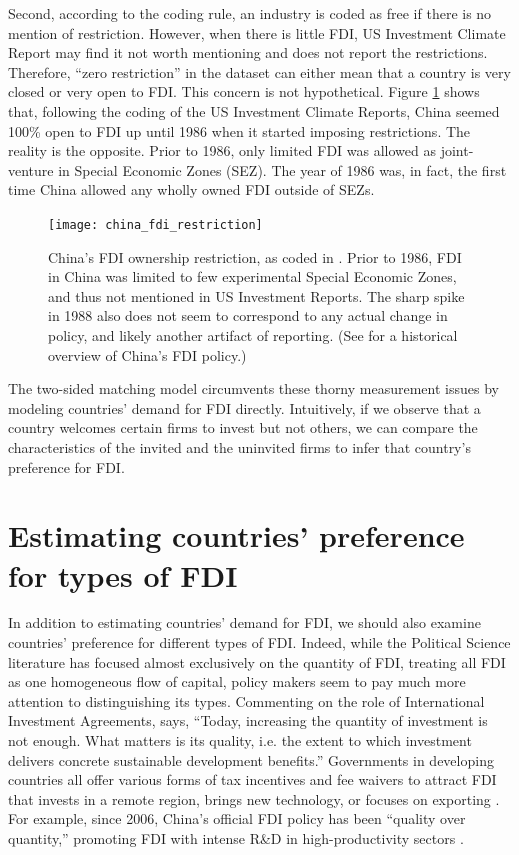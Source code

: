 Second, according to the coding rule, an industry is coded as free if there is
no mention of restriction. However, when there is little FDI, US Investment
Climate Report may find it not worth mentioning and does not report the
restrictions. Therefore, ``zero restriction'' in the dataset can either mean
that a country is very closed or very open to FDI. This concern is not
hypothetical. Figure \ref{fig:china_fdi_restriction} shows that, following the
coding of the US Investment Climate Reports, China seemed 100\% open to FDI up
until 1986 when it started imposing restrictions. The reality is the opposite.
Prior to 1986, only limited FDI was allowed as joint-venture in Special Economic
Zones (SEZ). The year of 1986 was, in fact, the first time China allowed any
wholly owned FDI outside of SEZs.

\begin{figure}[tbp] \centering
  \texttt{[image: china\_fdi\_restriction]}
  \caption[China's FDI ownership restriction.]{China's FDI ownership
    restriction, as coded in \citet{Pandya2010}. Prior to 1986, FDI in China was
    limited to few experimental Special Economic Zones, and thus not mentioned
    in US Investment Reports. The sharp spike in 1988 also does not seem to
    correspond to any actual change in policy, and likely another artifact of
    reporting. (See \citet{Zebregs2002} for a historical overview of China's FDI
    policy.)}
  \label{fig:china_fdi_restriction}
\end{figure}

The two-sided matching model circumvents these thorny measurement issues by
modeling countries' demand for FDI directly. Intuitively, if we observe that a
country welcomes certain firms to invest but not others, we can compare the
characteristics of the invited and the uninvited firms to infer that country's
preference for FDI.

\section{Estimating countries' preference for types of FDI}

In addition to estimating countries' demand for FDI, we should also examine
countries' preference for different types of FDI. Indeed, while the Political
Science literature has focused almost exclusively on the quantity of FDI,
treating all FDI as one homogeneous flow of capital, policy makers seem to pay
much more attention to distinguishing its types. Commenting on the role of
International Investment Agreements, \citet{UNCTAD2015} says, ``Today,
increasing the quantity of investment is not enough. What matters is its
quality, i.e. the extent to which investment delivers concrete sustainable
development benefits.'' Governments in developing countries all offer various
forms of tax incentives and fee waivers to attract FDI that invests in a remote
region, brings new technology, or focuses on exporting \citep{Ricupero2000}. For
example, since 2006, China's official FDI policy has been ``quality over
quantity,'' promoting FDI with intense R\&D in high-productivity sectors
\citep{Guangzhou2011}.

